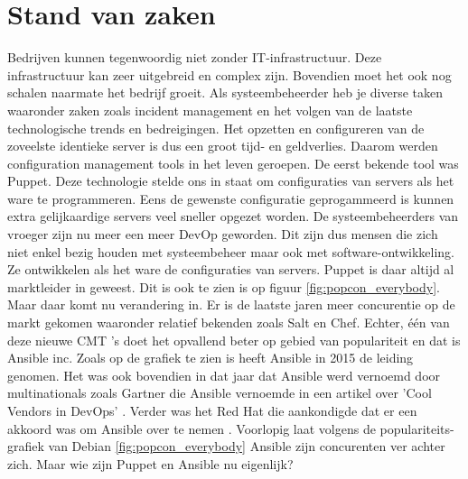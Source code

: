 \section{Stand van zaken}
\label{sec:stand-van-zaken}
Bedrijven kunnen tegenwoordig niet zonder IT-infrastructuur. Deze infrastructuur kan zeer uitgebreid en complex zijn. Bovendien moet het ook nog schalen naarmate het bedrijf groeit. Als systeembeheerder heb je diverse taken waaronder zaken zoals incident management en het volgen van de laatste technologische trends en bedreigingen. Het opzetten en configureren van de zoveelste identieke server is dus een groot tijd- en geldverlies. Daarom werden configuration management tools in het leven geroepen. De eerst bekende tool was Puppet. Deze technologie stelde ons in staat om configuraties van servers als het ware te programmeren. Eens de gewenste configuratie geprogammeerd is kunnen extra gelijkaardige servers veel sneller opgezet worden. De systeembeheerders van vroeger zijn nu meer een meer DevOp geworden. Dit zijn dus mensen die zich niet enkel bezig houden met systeembeheer maar ook met software-ontwikkeling. Ze ontwikkelen als het ware de configuraties van servers. Puppet is daar altijd al marktleider in geweest. Dit is ook te zien is op figuur \ref{fig:popcon_everybody}. Maar daar komt nu verandering in. Er is de laatste jaren meer concurentie op de markt gekomen waaronder relatief bekenden zoals Salt en Chef. 
Echter,  \'e\'en van deze nieuwe CMT 's doet het opvallend beter op gebied van populariteit en dat is Ansible inc. Zoals op de grafiek te zien is heeft Ansible in 2015 de leiding genomen. Het was ook bovendien in dat jaar dat Ansible werd vernoemd door multinationals zoals Gartner die Ansible vernoemde in een artikel over  'Cool Vendors in DevOps' \autocite{coolvendors}. Verder was het Red Hat die aankondigde dat er een akkoord was om Ansible over te nemen \autocite{redhatovername}. Voorlopig laat volgens de populariteits-grafiek van Debian \ref{fig:popcon_everybody} Ansible zijn concurenten ver achter zich. Maar wie zijn Puppet en Ansible nu eigenlijk?

